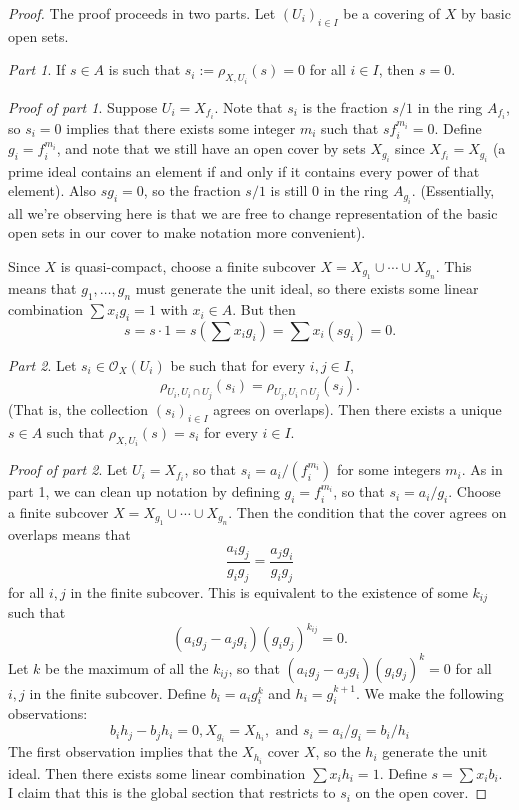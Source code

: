 \begin{proof}
The proof proceeds in two parts. Let $ (U_i)_{i \in I}$ be a
covering of $ X$ by basic open sets.

\emph{Part 1}. If $ s \in A$ is such that $ s_i := \rho_{X,
U_i}(s) = 0$ for all $ i \in I$, then $ s = 0$.

\emph{Proof of part 1}. Suppose $ U_i = X_{f_i}$. Note that $
s_i$ is the fraction $ s/1$ in the ring $ A_{f_i}$, so $ s_i =
0$ implies that there exists some integer $ m_i$ such that $
sf_i^{m_i} = 0$. Define $ g_i = f_i ^{m_i}$, and note that we
still have an open cover by sets $ X_{g_i}$ since $ X_{f_i} =
X_{g_i}$ (a prime ideal contains an element if and only if it
contains every power of that element). Also $ s g_i = 0$, so the
fraction $ s/1$ is still $ 0$ in the ring $ A_{g_i}$.
(Essentially, all we're observing here is that we are free to
change representation of the basic open sets in our cover to
make notation more convenient).

Since $ X$ is quasi-compact, choose a finite subcover $ X =
X_{g_1} \cup \dotsb \cup X_{g_n}$. This means that $ g_1,
\dotsc, g_n$ must generate the unit ideal, so there exists some
linear combination $ \sum x_i g_i = 1$ with $ x_i \in A$. But
then
\[ s = s \cdot 1 = s \left( \sum x_i g_i \right) = \sum x_i (s
g_i) = 0.\]

\emph{Part 2}. Let $ s_i \in \mathcal{O}_X(U_i)$ be such that
for every $ i, j \in I$,
\[ \rho_{U_i, U_i \cap U_j}(s_i) = \rho_{U_j, U_i \cap
U_j}(s_j).\]
(That is, the collection $ (s_i)_{i \in I}$ agrees on overlaps).
Then there exists a unique $ s \in A$ such that $ \rho_{X,
U_i}(s) = s_i$ for every $ i \in I$.

\emph{Proof of part 2}. Let $ U_i = X_{f_i}$, so that $ s_i =
a_i/(f_i^{m_i})$ for some integers $ m_i$. As in part 1, we can
clean up notation by defining $ g_i = f_i^{m_i}$, so that $ s_i
= a_i/g_i$. Choose a finite subcover $ X = X_{g_1} \cup \dotsb
\cup X_{g_n}$. Then the condition that the cover agrees on
overlaps means that
\[ \frac{a_i g_j}{g_i g_j} = \frac{a_j g_i}{g_i g_j} \]
for all $ i, j$ in the finite subcover. This is equivalent to
the existence of some $ k_{ij}$ such that
\[ (a_i g_j - a_j g_i) (g_i g_j)^{k_{ij}} = 0.\]
Let $ k$ be the maximum of all the $ k_{ij}$, so that $ (a_i g_j
- a_j g_i)(g_i g_j)^k = 0$ for all $ i, j$ in the finite
subcover. Define $ b_i = a_i g_i^k$ and $ h_i = g_i^{k+1}$. We
make the following observations:
\[ b_i h_j - b_j h_i = 0, X_{g_i} = X_{h_i}, \text{ and } s_i =
a_i/g_i = b_i/h_i \]
The first observation implies that the $ X_{h_i}$ cover $ X$, so
the $ h_i$ generate the unit ideal. Then there exists some
linear combination $ \sum x_i h_i = 1$. Define $ s = \sum x_i
b_i$. I claim that this is the global section that restricts to
$ s_i$ on the open cover.


\end{proof}
